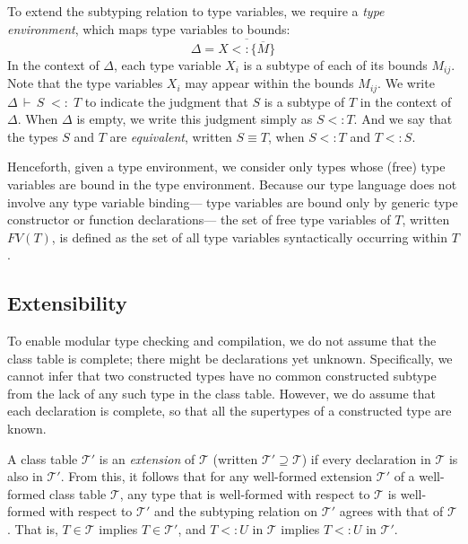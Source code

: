 \documentclass[10pt]{sigplanconf}
\newcommand{\TODO}[1]{\textbf{\emph{\textcolor{red}{TODO}}}: \textsf{\footnotesize #1}}
\renewcommand{\bar}{\overline}
\newcommand{\extends}{\ensuremath{<:}}
\newcommand{\subtypeof}{\ensuremath{<:}}
\newcommand{\FV}{\ensuremath{\mathit{FV}}}
\newcommand{\bd}[1]{\ensuremath{\{\bar{#1}\}}}
\newcommand{\bds}[2]{\ensuremath{\bar{{#1} \extends \bd{#2}}}}
\newcommand{\T}{\ensuremath{\mathcal{T}}}
\newcommand{\ctext}{\ensuremath{\supseteq}}
\newcommand{\jgtemplate}[4][\Delta]{\ensuremath{{#1}\,\vdash\,{#2}\;{#3}\;{#4}}}
\newcommand{\jgsub}[3][\Delta]{\jgtemplate[#1]{#2}{\subtypeof}{#3}}
\begin{document}
To extend the subtyping relation to type variables,
we require  a \emph{type environment}, 
which maps type variables to bounds:
\[
\Delta = \bds{X}{M}
\]
In the context of $\Delta$, 
each type variable $X_i$ is a subtype of each of its bounds $M_{ij}$.
Note that the type variables $X_i$ may appear within the bounds $M_{ij}$.
We write $\jgsub{S}{T}$ 
to indicate the judgment that $S$ is a subtype of $T$ 
in the context of $\Delta$.
When $\Delta$ is empty, 
we write this judgment simply as $S \subtypeof T$.
And we say that the types $S$ and $T$ are \emph{equivalent},
written $S \equiv T$, 
when $S \subtypeof T$ and $T \subtypeof S$.

Henceforth, 
given a type environment, 
we consider only types whose (free) type variables 
are bound in the type environment.
Because our type language does not involve any type variable binding---%
type variables are bound only by generic type constructor or function
declarations---%
the set of free type variables of $T$, written $\FV(T)$, is defined as
the set of all type variables syntactically occurring within $T$.




\subsection{Extensibility}

To enable modular type checking and compilation, 
we do not assume that the class table is complete;
there might be declarations yet unknown.
Specifically, 
we cannot infer that two constructed types 
have no common constructed subtype 
from the lack of any such type in the class table.
However, we do assume that each declaration is complete, 
so that all the supertypes of a constructed type 
are known.

A class table $\T'$ is an \emph{extension} of $\T$ (written $\T' \ctext \T$)
if every declaration in $\T$ is also in $\T'$.
From this, 
it follows that 
for any well-formed extension $\T'$ of a well-formed class table $\T$, 
any type that is well-formed with respect to $\T$ 
is well-formed with respect to $\T'$ 
and the subtyping relation on $\T'$ agrees with that of $\T$. 
That is, 
$T \in \T$ implies $T \in \T'$, 
and $T \subtypeof U$ in $\T$ implies $T \subtypeof U$ in $\T'$.
\end{document}
